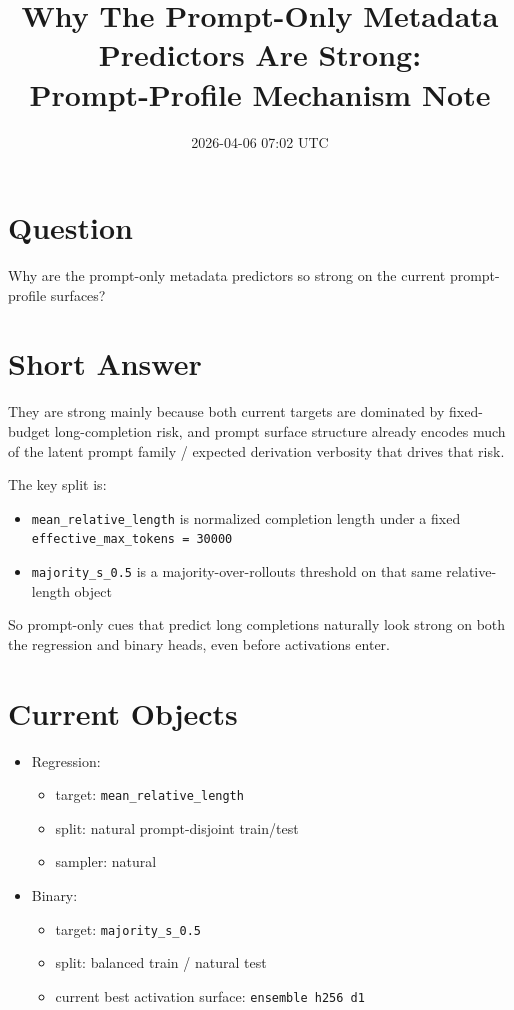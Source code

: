 \documentclass[11pt]{article}
\title{Why The Prompt-Only Metadata Predictors Are Strong:\\Prompt-Profile Mechanism Note}
\author{}
\date{2026-04-06 07:02 UTC}
\begin{document}
\maketitle

\section*{Question}
Why are the prompt-only metadata predictors so strong on the current prompt-profile surfaces?

\section*{Short Answer}
They are strong mainly because both current targets are dominated by fixed-budget long-completion risk, and prompt surface structure already encodes much of the latent prompt family / expected derivation verbosity that drives that risk.

The key split is:
\begin{itemize}[leftmargin=1.5em]
\item \texttt{mean\_relative\_length} is normalized completion length under a fixed \texttt{effective\_max\_tokens = 30000}
\item \texttt{majority\_s\_0.5} is a majority-over-rollouts threshold on that same relative-length object
\end{itemize}

So prompt-only cues that predict long completions naturally look strong on both the regression and binary heads, even before activations enter.

\section*{Current Objects}
\begin{itemize}[leftmargin=1.5em]
\item Regression:
  \begin{itemize}[leftmargin=1.5em]
  \item target: \texttt{mean\_relative\_length}
  \item split: natural prompt-disjoint train/test
  \item sampler: natural
  \end{itemize}
\item Binary:
  \begin{itemize}[leftmargin=1.5em]
  \item target: \texttt{majority\_s\_0.5}
  \item split: balanced train / natural test
  \item current best activation surface: \texttt{ensemble h256 d1}
  \end{itemize}
\end{itemize}
\end{document}
